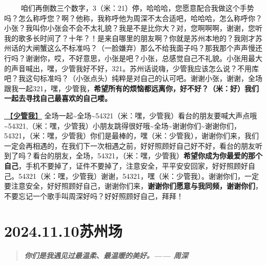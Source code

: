 \documentclass[]{ctexbook}
\begin{document}
   咱们再倒数三个数字，3（米：21）停，哈哈哈，您愿意配合我做这个手势吗？怎么称呼您？啊？他称，我称呼他为周深不太合适吧，哈哈哈，怎么称呼你？小张？我叫你小张会不会不太礼貌？我是不是比你大？对，您啊啊啊，谢谢，您听我的歌多长时间了？十年？！是来自哪里的朋友啊？你就是苏州本地的？我刚才苏州话的大闸蟹这么不标准吗？（一脸嫌弃）那么不给我面子吗？那我那个声声慢还行吗？谢谢你，哎，不好意思，小张是吧？小张，总感觉自己不礼貌。小张用最大的声音喊出，嘿，少管我好不好，321。苏州话说嗨，少管我应该怎么说？不用库吧？我这句标准吗？（小张点头）纯粹是对自己的认可吧。谢谢小张，谢谢，全场跟我一起321，嘿，少管我，\textbf{希望所有的烦恼都远离你，好不好？（米：好）我们一起去寻找自己最喜欢的自己喽。}

\hyperref[watch-ur-manners]{🎵【\textbf{少管我}】} 全场一起\textasciitilde 全场\textasciitilde54321（米：嘿，少管我）看台的朋友要喊大声点哦\textasciitilde54321,（米：嘿，少管我）小朋友跳得很好哦\textasciitilde 全场\textasciitilde 谢谢你们\textasciitilde 谢谢你们，54321，（米：嘿，少管我）你们是最棒的，嘿（米：少管我），谢谢你们来，我们一定会再相遇的，在我们下一次相遇之前，好好照顾好自己好不好，看台的朋友听到了吗？看台的朋友，全场，54321，（米：嘿，少管我）\textbf{希望你成为你最爱的那个自己}，手机不要掉了，证件不要掉了，注意安全，平平安安回家，好好照顾好自己。54321（米：嘿，少管我）谢谢，54321，嘿（米：少管我）。谢谢你们，一定要注意安全，好好照顾好自己，谢谢你们来，\textbf{谢谢你们愿意与我同频，谢谢你们}，不要忘记一个歌手叫周深好吗？好好照顾好自己，拜拜！

\chapter{2024.11.10苏州场}\label{suzhou-20241110}

\begin{quote}
\textbf{\emph{你们是我遇见过最温柔、最温暖的美好。------ 周深}}
\end{quote}
\end{document}
